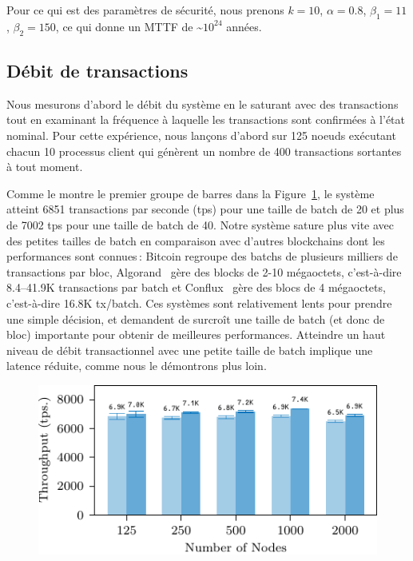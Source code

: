 Pour ce qui est des paramètres de sécurité, nous prenons $k = 10$, $\alpha = 0.8$, $\beta_1 = 11$, $\beta_2 = 150$,
ce qui donne un MTTF de \textasciitilde{}$10^{24}$ années.

\subsection{Débit de transactions}

Nous mesurons d'abord le débit du système en le saturant avec des transactions tout en examinant
la fréquence à laquelle les transactions sont confirmées à l'état nominal. Pour cette expérience, nous lançons
d'abord {\sysname} sur 125 noeuds exécutant chacun 10 processus client qui génèrent un nombre de
400 transactions sortantes à tout moment.

Comme le montre le premier groupe de barres dans la Figure~\ref{fig:eval-thr}, le système atteint 6851
transactions par seconde (tps) pour une taille de batch de 20 et plus de 7002 tps pour une taille de
batch de 40. Notre système sature plus vite avec des petites tailles de batch en comparaison avec d'autres
blockchains dont les performances sont connues\,: Bitcoin regroupe des batchs de plusieurs milliers de
transactions par bloc, Algorand~\cite{GiladHMVZ17} gère des blocks de 2-10 mégaoctets, c'est-à-dire 8.4--41.9K
transactions par batch et Conflux~\cite{confluxLLXLC18} gère des blocs de 4 mégaoctets, c'est-à-dire 16.8K tx/batch.
Ces systèmes sont relativement lents pour prendre une simple décision, et demandent de surcroît une taille
de batch (et donc de bloc) importante pour obtenir de meilleures performances. Atteindre un haut niveau de débit
transactionnel avec une petite taille de batch implique une latence réduite, comme nous le démontrons plus loin.

\begin{figure}[h]
\includegraphics[width=\linewidth]{figures/thr-ava.pdf}
\label{fig:eval-thr}
\end{figure}

